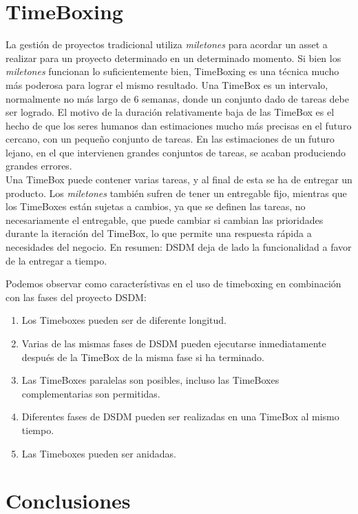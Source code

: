 \documentclass[12pt,a4paper]{article}
\begin{document}
\section{TimeBoxing}
La gestión de proyectos tradicional utiliza \emph{miletones} para acordar un asset a realizar para un proyecto determinado en un determinado momento. Si bien los \emph{miletones} funcionan lo suficientemente bien, TimeBoxing es una técnica mucho más poderosa para lograr el mismo resultado. Una TimeBox es un intervalo, normalmente no más largo de 6 semanas, donde un conjunto dado de tareas debe ser logrado. El motivo de la duración relativamente baja de las TimeBox es el hecho de que los seres humanos dan estimaciones mucho más precisas en el futuro cercano, con un pequeño conjunto de tareas.
En las estimaciones de un futuro lejano, en el que intervienen grandes conjuntos de tareas, se acaban produciendo grandes errores.\\

 Una TimeBox puede contener varias tareas, y al final de esta se ha de entregar un producto. Los \emph{miletones} también
sufren de tener un entregable fijo, mientras que los TimeBoxes están sujetas a cambios, ya que se definen las tareas, no necesariamente el entregable, que puede cambiar si cambian las prioridades durante la iteración del TimeBox, lo que permite una respuesta rápida a necesidades del negocio. En resumen: DSDM deja de lado la funcionalidad a favor de la entregar a tiempo. 

Podemos observar como característivas en el uso de timeboxing en combinación con las fases del proyecto DSDM:
\begin{enumerate}
	\item  Los Timeboxes pueden ser de diferente longitud.
	\item  Varias de las mismas fases de DSDM pueden ejecutarse inmediatamente después de la TimeBox de la misma fase si ha terminado.
\item Las TimeBoxes paralelas son posibles, incluso las TimeBoxes complementarias son permitidas.
\item Diferentes fases de DSDM pueden ser realizadas en una TimeBox al mismo tiempo.
\item Las Timeboxes pueden ser anidadas.
\end{enumerate}



\section{Conclusiones}
\end{document}
